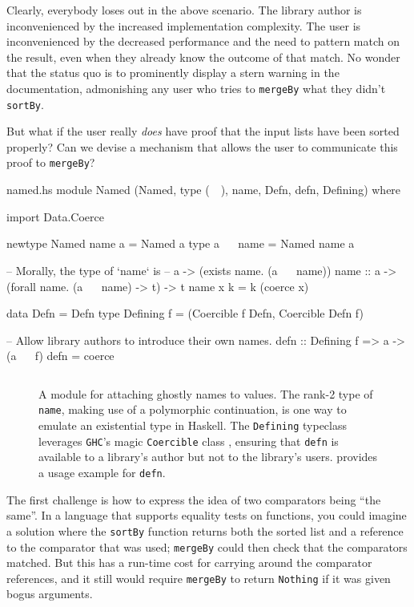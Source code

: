 \documentclass[format=sigplan, review=false, screen=true]{acmart}
\makeatletter
\let\origsubsection\subsection
\renewcommand\subsection{\@ifstar{\starsubsection}{\nostarsubsection}}
\newcommand\nostarsubsection[1]
{\subsectionprelude\origsubsection{#1}\subsectionpostlude}
\newcommand\starsubsection[1]
{\subsectionprelude\origsubsection*{#1}\subsectionpostlude}
\newcommand\subsectionprelude{%
  \vspace{-0.25em}
}
\newcommand\subsectionpostlude{%
  \vspace{-0.05em}
}
\makeatother
\begin{document}
Clearly, everybody loses out in the above scenario. The
library author is inconvenienced by the increased implementation complexity.
The user is inconvenienced by the decreased performance and the need to
pattern match on the result, even when they  already know the
outcome of that match. No wonder that the status quo is to prominently display
a stern warning in the documentation, admonishing
any user who tries to \texttt{mergeBy} what they didn't \texttt{sortBy}.

But what if the user really \emph{does} have proof that the input lists have
been sorted properly? Can we devise a mechanism that allows the user to communicate
this proof to \texttt{mergeBy}?

\subsection{Conjuring a name}

\begin{filecontents*}{named.hs}
module Named
  (Named, type (~~), name, Defn, defn, Defining) where

import Data.Coerce

newtype Named name a = Named a
type a ~~ name = Named name a

-- Morally, the type of `name` is
--      a -> (exists name. (a ~~ name))
name :: a -> (forall name. (a ~~ name) -> t) -> t
name x k = k (coerce x)

data Defn = Defn
type Defining f = (Coercible f Defn, Coercible Defn f)

-- Allow library authors to introduce their own names.
defn :: Defining f => a -> (a ~~ f)
defn = coerce
\end{filecontents*}
\begin{figure}[b]
  \inputminted{haskell}{named.hs}
  \caption{A module for attaching ghostly names to values. The rank-2 type of \texttt{name},
    making use of a polymorphic continuation, is one way to emulate an existential type in
    Haskell. The \texttt{Defining} typeclass
    leverages \texttt{GHC}'s magic \texttt{Coercible} class \cite{Breitner:2014:SZC:2692915.2628141},
    ensuring that \texttt{defn} is available to a library's author but not
    to the library's users.  provides a usage example for \texttt{defn}.\label{name-module}}
\end{figure}


The first challenge is how to express the idea of two  comparators
being ``the same''. In a language that supports equality tests on functions,
you could imagine a solution where the \texttt{sortBy} function returns both the sorted
list and a reference to the comparator that was used; \texttt{mergeBy} could
then check that the comparators matched. But this has a run-time cost for carrying
around the comparator references, and it still would require \texttt{mergeBy} to
return \texttt{Nothing} if it was given bogus arguments.
\end{document}
